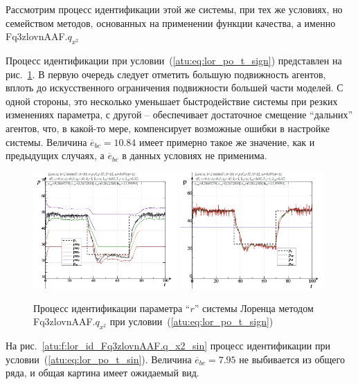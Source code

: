 Рассмотрим процесс идентификации этой же системы, при тех же условиях,
но семейством методов, основанных на применении функции качества,
а именно Fq3zlovnAAF.$q_{x^2}$

Процесс идентификации при условии~(\ref{atu:eq:lor_po_t_sign})
представлен на рис.~\ref{atu:f:lor_id_Fq3zlovnAAF.q_x2_sign}.
В первую очередь следует отметить большую подвижность
агентов, вплоть до искусственного ограничения подвижности
большей части моделей. С одной стороны, это несколько уменьшает
быстродействие системы при резких изменениях параметра,
с другой -- обеспечивает достаточное смещение ``дальних'' агентов,
что, в какой-то мере, компенсирует возможные ошибки в настройке системы.
Величина $\overline{e}_{bc}=10.84$ имеет примерно такое же значение,
как и предыдущих случаях,
а $\overline{e}_{be}$ в данных условиях не применима.

\begin{figure}[ht!]
  \centerline{
    \includegraphics[width=0.49\textwidth]{p/cha/lor/Fq3zlovnAAF/lor_Fq3zlovnAAF_qx2-pl_n_sign.png}
    \hfill
    \includegraphics[width=0.49\textwidth]{p/cha/lor/Fq3zlovnAAF/lor_Fq3zlovnAAF_qx2-p_p_sign.png}
  }
  \caption{Процесс идентификации параметра ``$r$'' системы Лоренца методом Fq3zlovnAAF.$q_{x^2}$ при условии~(\ref{atu:eq:lor_po_t_sign})}
  \label{atu:f:lor_id_Fq3zlovnAAF.q_x2_sign}
\end{figure}

На рис.~\ref{atu:f:lor_id_Fq3zlovnAAF.q_x2_sin}
процесс идентификации при условии~(\ref{atu:eq:lor_po_t_sin}).
Величина $\overline{e}_{bc}=7.95$ не выбивается из общего ряда,
и общая картина имеет ожидаемый вид.

